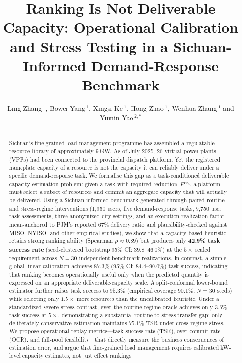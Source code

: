 \documentclass[utf8]{FrontiersinHarvard}
\makeatletter
\newcommand{\Preq}{P^{\mathrm{req}}}
\def\firstAuthorLast{Zhang {et~al.}}
\def\Authors{Ling Zhang\,$^{1}$, Bowei Yang\,$^{1}$, Xingsi Ke\,$^{1}$, Hong Zhao\,$^{1}$, Wenhua Zhang\,$^{1}$ and Yumin Yao\,$^{2,*}$}
\def\Address{$^{1}$State Grid Sichuan Electric Power Corporation, Chengdu, Sichuan, China \\
$^{2}$Central South University, Changsha, China}
\def\corrAuthor{Yumin Yao}
\def\corrEmail{yaoyumin@csu.edu.cn}
\makeatother
\begin{document}
\onecolumn
{}

\title[Ranking Is Not Deliverable Capacity]{Ranking Is Not Deliverable Capacity: Operational Calibration and Stress Testing in a Sichuan-Informed Demand-Response Benchmark}

\author[\firstAuthorLast ]{\Authors}
\address{\Address}
\correspondance{\corrAuthor\\\corrEmail}

\extraAuth{}

\maketitle

\begin{abstract}
\section{}
Sichuan's fine-grained load-management programme has assembled a
regulatable resource library of approximately 9\,GW. As of July
2025, 26 virtual power plants (VPPs) had been connected to the
provincial dispatch platform. Yet the registered nameplate
capacity of a resource is not the capacity it can reliably
deliver under a specific demand-response task. We formalise this
gap as a task-conditioned deliverable capacity estimation
problem: given a task with required reduction~$\Preq$, a
platform must select a subset of resources and commit
an aggregate capacity that will actually be delivered.
Using a Sichuan-informed benchmark generated through paired
routine- and stress-regime interventions
(1{,}950 users, five demand-response tasks, 9{,}750 user--task
assessments, three anonymized city settings, and an execution
realization factor mean-anchored to PJM's reported 67\%
delivery ratio and plausibility-checked against MISO, NYISO,
and other empirical studies), we show that a capacity-based heuristic
retains strong ranking ability
(Spearman $\rho \approx 0.89$) but produces only
\textbf{42.9\% task success rate} (seed-clustered
bootstrap 95\% CI: 39.8--46.0\%) at the $5\times$ scaled requirement across
$N=30$ independent benchmark realizations.
In contrast, a simple global linear calibration achieves
$87.3\%$ (95\% CI: 84.4--90.0\%) task success, indicating
that ranking becomes operationally useful only when the predicted
quantity is expressed on an appropriate deliverable-capacity scale.
A split-conformal lower-bound estimator further raises task
success to $95.3\%$ (empirical coverage 90.1\%; $N=30$ seeds)
while selecting only
$1.5\times$ more
resources than the uncalibrated heuristic.
Under a standardized severe stress contrast,
even the routine-regime oracle achieves only
$3.6\%$ task success at $5\times$, demonstrating a substantial
routine-to-stress transfer gap; only deliberately conservative
estimation maintains $75.1\%$ TSR under cross-regime stress.
We propose operational replay metrics---task success rate (TSR),
over-commit rate (OCR), and full-pool feasibility---that directly
measure the business consequences of estimation error, and argue
that fine-grained load management requires calibrated
kW-level capacity estimates, not just effect rankings.


\end{abstract}
\end{document}

